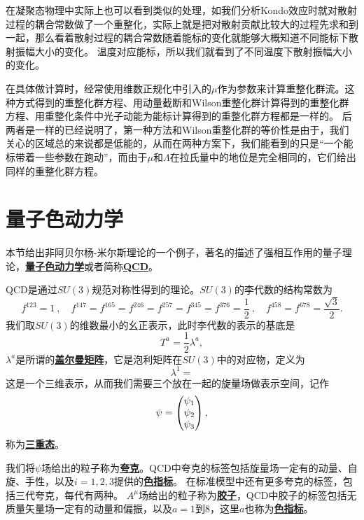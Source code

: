 \documentclass[hyperref, UTF8, a4paper]{ctexart}
\newcommand{\concept}[1]{\underline{\textbf{#1}}}
\begin{document}
在凝聚态物理中实际上也可以看到类似的处理，如我们分析Kondo效应时就对散射过程的耦合常数做了一个重整化，实际上就是把对散射贡献比较大的过程先求和到一起，那么看着散射过程的耦合常数随着能标的变化就能够大概知道不同能标下散射振幅大小的变化。
温度对应能标，所以我们就看到了不同温度下散射振幅大小的变化。

在具体做计算时，经常使用维数正规化中引入的$\mu$作为参数来计算重整化群流。这种方式得到的重整化群方程、用动量截断和Wilson重整化群计算得到的重整化群方程、用重整化条件中光子动能为能标计算得到的重整化群方程都是一样的。
后两者是一样的已经说明了，第一种方法和Wilson重整化群的等价性是由于，我们关心的区域总的来说都是低能的，从而在两种方案下，我们能看到的只是“一个能标带着一些参数在跑动”，而由于$\mu$和$\Lambda$在拉氏量中的地位是完全相同的，它们给出同样的重整化群方程。

\section{量子色动力学}

本节给出非阿贝尔杨-米尔斯理论的一个例子，著名的描述了强相互作用的量子理论，\concept{量子色动力学}或者简称\concept{QCD}。

QCD是通过$SU(3)$规范对称性得到的理论。$SU(3)$的李代数的结构常数为
\begin{equation}
    f^{123}=1\ ,\quad f^{147}=f^{165}=f^{246}=f^{257}=f^{345}=f^{376}={\frac {1}{2}}\ ,\quad f^{458}=f^{678}={\frac {\sqrt {3}}{2}}.
\end{equation}
我们取$SU(3)$的维数最小的幺正表示，此时李代数的表示的基底是
\begin{equation}
    T^a = \frac{1}{2} \lambda^a,
\end{equation}
$\lambda^a$是所谓的\concept{盖尔曼矩阵}，它是泡利矩阵在$SU(3)$中的对应物，定义为
\begin{equation}
    \lambda^1 = 
\end{equation}
这是一个三维表示，从而我们需要三个放在一起的旋量场做表示空间，记作
\begin{equation}
    \psi = \pmqty{\psi_1 \\ \psi_2 \\ \psi_3},
\end{equation}
称为\concept{三重态}。

我们将$\psi$场给出的粒子称为\concept{夸克}。QCD中夸克的标签包括旋量场一定有的动量、自旋、手性，以及$i=1, 2, 3$提供的\concept{色指标}。
在标准模型中还有更多夸克的标签，包括三代夸克，每代有两种。
$A^\mu$场给出的粒子称为\concept{胶子}，QCD中胶子的标签包括无质量矢量场一定有的动量和偏振，以及$a=1$到$8$，这里$a$也称为\concept{色指标}。
\end{document}
